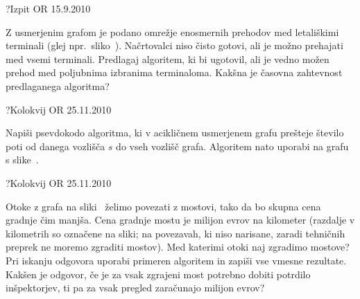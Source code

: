 \begin{naloga}{?}{Izpit OR 15.9.2010}
\begin{vprasanje}[letalisce]
Z usmerjenim grafom je podano omrežje enosmernih prehodov
med letališkimi terminali (glej npr.~sliko~).
Načrtovalci niso čisto gotovi, ali je možno prehajati med vsemi terminali.
Predlagaj algoritem, ki bi ugotovil,
ali je vedno možen prehod med poljubnima izbranima terminaloma.
Kakšna je časovna zahtevnost predlaganega algoritma?

\end{vprasanje}
\begin{odgovor}
\end{odgovor}
\end{naloga}


\begin{naloga}{?}{Kolokvij OR 25.11.2010}
\begin{vprasanje}[stpoti]
Napiši psevdokodo algoritma,
ki v acikličnem usmerjenem grafu prešteje število poti
od danega vozlišča $s$ do vseh vozlišč grafa.
Algoritem nato uporabi na grafu s slike~\fig{}.

\begin{slika}
\pgfslika
{}
\end{slika}
\end{vprasanje}
\begin{odgovor}
\end{odgovor}
\end{naloga}


\begin{naloga}{?}{Kolokvij OR 25.11.2010}
\begin{vprasanje}[otoki]
Otoke z grafa na sliki~\fig{} želimo povezati z mostovi,
tako da bo skupna cena grad\-nje čim manjša.
Cena gradnje mostu je milijon evrov na kilometer
(razdalje v kilometrih so označene na sliki;
na povezavah, ki niso narisane,
zaradi tehničnih preprek ne moremo zgraditi mostov).
Med katerimi otoki naj zgradimo mostove?
Pri iskanju odgovora uporabi primeren algoritem
in zapiši vse vmesne rezultate.
Kakšen je odgovor,
če je za vsak zgrajeni most potrebno dobiti potrdilo inšpektorjev,
ti pa za vsak pregled zaračunajo milijon evrov?

\begin{slika}
\pgfslika
{}
\end{slika}
\end{vprasanje}
\begin{odgovor}
\end{odgovor}
\end{naloga}



